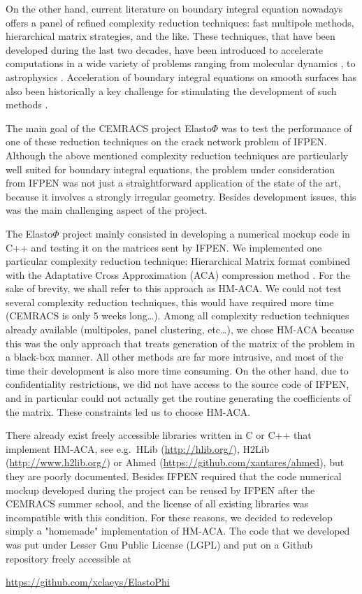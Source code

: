 \bigskip
On the other hand, current literature on boundary integral equation nowadays offers a panel of refined complexity reduction 
techniques: fast multipole methods, hierarchical matrix strategies, and the like. These techniques, that have been developed 
during the last two decades, have been introduced to accelerate computations in a wide variety of problems ranging from molecular 
dynamics \cite{?}, to astrophysics \cite{?}. Acceleration of boundary integral equations on smooth surfaces has also been 
historically a key challenge for stimulating the development of such methods \cite{?}.

\bigskip
The main goal of the CEMRACS project Elasto$\Phi$ was to test the performance of one of these reduction techniques on the 
crack network problem of IFPEN. Although the above mentioned complexity reduction techniques are particularly well suited  
for boundary integral equations, the problem under consideration from IFPEN was not just a straightforward application of 
the state of the art, because it involves a strongly irregular geometry. Besides development issues, this was the main 
challenging  aspect of the project.

\bigskip
The Elasto$\Phi$ project mainly consisted in developing a numerical mockup code in C++ and testing it on the matrices sent 
by IFPEN. We implemented one particular complexity reduction technique: Hierarchical Matrix \cite{?} format combined with the Adaptative Cross 
Approximation (ACA) compression method \cite{?}. For the sake of brevity, we shall refer to this approach as HM-ACA. We could not test several 
complexity reduction techniques, this would have required more time (CEMRACS is only 5 weeks long\dots). Among all complexity reduction techniques 
already available (multipoles, panel clustering, etc\dots), we chose HM-ACA because this was the only approach that treats generation 
of the matrix of the problem in a black-box manner. All other methods are far more intrusive, and most of the time their development 
is also more time consuming. On the other hand, due to confidentiality restrictions, we did not have access to the source code of IFPEN, and 
in particular could not actually get the routine generating the coefficients of the matrix. These constraints led us to choose HM-ACA.

\bigskip
There already exist freely accessible libraries written in C or C++ that implement HM-ACA, see e.g.~HLib (\url{http://hlib.org/}), H2Lib 
(\url{http://www.h2lib.org/}) or Ahmed (\url{https://github.com/xantares/ahmed}),  but they are poorly documented. Besides IFPEN required 
that the code numerical mockup developed during the project can be reused by IFPEN after the CEMRACS summer school, 
and the license of all existing libraries was incompatible with this condition. For these reasons, we decided to redevelop simply  
a "homemade" implementation of HM-ACA. The code that we developed was put under Lesser Gnu Public License (LGPL) and 
put on a Github repository freely accessible at
\begin{center}
\url{https://github.com/xclaeys/ElastoPhi}
\end{center}


